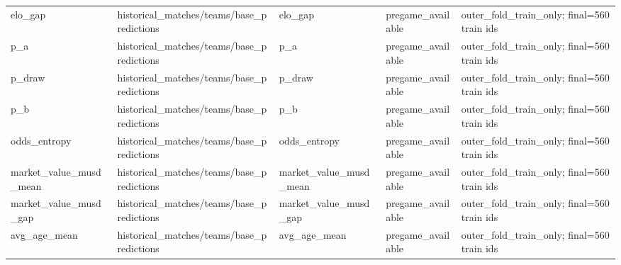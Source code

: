 {\begin{longtable}{p{}p{}p{}p{}p{}}
elo\_\allowbreak{}gap & historical\_\allowbreak{}matches/\allowbreak{}teams/\allowbreak{}base\_\allowbreak{}predictions & elo\_\allowbreak{}gap & pregame\_\allowbreak{}available & outer\_\allowbreak{}fold\_\allowbreak{}train\_\allowbreak{}only;\allowbreak{} final=560 train ids \\
p\_\allowbreak{}a & historical\_\allowbreak{}matches/\allowbreak{}teams/\allowbreak{}base\_\allowbreak{}predictions & p\_\allowbreak{}a & pregame\_\allowbreak{}available & outer\_\allowbreak{}fold\_\allowbreak{}train\_\allowbreak{}only;\allowbreak{} final=560 train ids \\
p\_\allowbreak{}draw & historical\_\allowbreak{}matches/\allowbreak{}teams/\allowbreak{}base\_\allowbreak{}predictions & p\_\allowbreak{}draw & pregame\_\allowbreak{}available & outer\_\allowbreak{}fold\_\allowbreak{}train\_\allowbreak{}only;\allowbreak{} final=560 train ids \\
p\_\allowbreak{}b & historical\_\allowbreak{}matches/\allowbreak{}teams/\allowbreak{}base\_\allowbreak{}predictions & p\_\allowbreak{}b & pregame\_\allowbreak{}available & outer\_\allowbreak{}fold\_\allowbreak{}train\_\allowbreak{}only;\allowbreak{} final=560 train ids \\
odds\_\allowbreak{}entropy & historical\_\allowbreak{}matches/\allowbreak{}teams/\allowbreak{}base\_\allowbreak{}predictions & odds\_\allowbreak{}entropy & pregame\_\allowbreak{}available & outer\_\allowbreak{}fold\_\allowbreak{}train\_\allowbreak{}only;\allowbreak{} final=560 train ids \\
market\_\allowbreak{}value\_\allowbreak{}musd\_\allowbreak{}mean & historical\_\allowbreak{}matches/\allowbreak{}teams/\allowbreak{}base\_\allowbreak{}predictions & market\_\allowbreak{}value\_\allowbreak{}musd\_\allowbreak{}mean & pregame\_\allowbreak{}available & outer\_\allowbreak{}fold\_\allowbreak{}train\_\allowbreak{}only;\allowbreak{} final=560 train ids \\
market\_\allowbreak{}value\_\allowbreak{}musd\_\allowbreak{}gap & historical\_\allowbreak{}matches/\allowbreak{}teams/\allowbreak{}base\_\allowbreak{}predictions & market\_\allowbreak{}value\_\allowbreak{}musd\_\allowbreak{}gap & pregame\_\allowbreak{}available & outer\_\allowbreak{}fold\_\allowbreak{}train\_\allowbreak{}only;\allowbreak{} final=560 train ids \\
avg\_\allowbreak{}age\_\allowbreak{}mean & historical\_\allowbreak{}matches/\allowbreak{}teams/\allowbreak{}base\_\allowbreak{}predictions & avg\_\allowbreak{}age\_\allowbreak{}mean & pregame\_\allowbreak{}available & outer\_\allowbreak{}fold\_\allowbreak{}train\_\allowbreak{}only;\allowbreak{} final=560 train ids \\

\end{longtable}}
